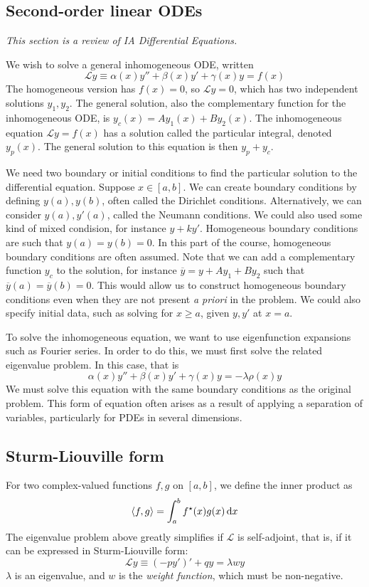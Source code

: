 \subsection{Second-order linear ODEs}
\textit{This section is a review of IA Differential Equations.}

\noindent We wish to solve a general inhomogeneous ODE, written
\[
	\mathcal L y \equiv \alpha(x) y'' + \beta(x) y' + \gamma(x) y = f(x)
\]
The homogeneous version has \( f(x) = 0 \), so \( \mathcal L y = 0 \), which has two independent solutions \( y_1, y_2 \).
The general solution, also the complementary function for the inhomogeneous ODE, is \( y_c(x) = A y_1(x) + B y_2(x) \).
The inhomogeneous equation \( \mathcal L y = f(x) \) has a solution called the particular integral, denoted \( y_p(x) \).
The general solution to this equation is then \( y_p + y_c \).

We need two boundary or initial conditions to find the particular solution to the differential equation.
Suppose \( x \in [a,b] \).
We can create boundary conditions by defining \( y(a), y(b) \), often called the Dirichlet conditions.
Alternatively, we can consider \( y(a), y'(a) \), called the Neumann conditions.
We could also used some kind of mixed condision, for instance \( y + ky' \).
Homogeneous boundary conditions are such that \( y(a) = y(b) = 0 \).
In this part of the course, homogeneous boundary conditions are often assumed.
Note that we can add a complementary function \( y_c \) to the solution, for instance \( \overline{y} = y + A y_1 + B y_2 \) such that \( \overline{y}(a) = \overline{y}(b) = 0 \).
This would allow us to construct homogeneous boundary conditions even when they are not present \textit{a priori} in the problem.
We could also specify initial data, such as solving for \( x \geq a \), given \( y, y' \) at \( x = a \).

To solve the inhomogeneous equation, we want to use eigenfunction expansions such as Fourier series.
In order to do this, we must first solve the related eigenvalue problem.
In this case, that is
\[
	\alpha(x) y'' + \beta(x) y' + \gamma(x) y = -\lambda \rho(x) y
\]
We must solve this equation with the same boundary conditions as the original problem.
This form of equation often arises as a result of applying a separation of variables, particularly for PDEs in several dimensions.

\subsection{Sturm-Liouville form}
For two complex-valued functions \( f, g \) on \( [a,b] \), we define the inner product as
\[
	\left\langle{f,g}\right\rangle = \int_a^b f^\star(x) g(x) \dd{x}
\]
The eigenvalue problem above greatly simplifies if \( \mathcal L \) is self-adjoint, that is, if it can be expressed in Sturm-Liouville form:
\[
	\mathcal L y \equiv (-py')' + qy = \lambda w y
\]
\( \lambda \) is an eigenvalue, and \( w \) is the \textit{weight function}, which must be non-negative.


